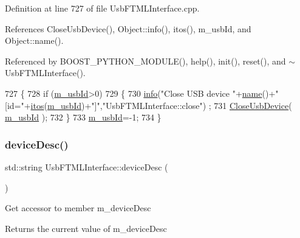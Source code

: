 Definition at line 727 of file Usb\+F\+T\+M\+L\+Interface.\+cpp.



References Close\+Usb\+Device(), Object\+::info(), itos(), m\+\_\+usb\+Id, and Object\+::name().



Referenced by B\+O\+O\+S\+T\+\_\+\+P\+Y\+T\+H\+O\+N\+\_\+\+M\+O\+D\+U\+L\+E(), help(), init(), reset(), and $\sim$\+Usb\+F\+T\+M\+L\+Interface().


\begin{DoxyCode}
727                                \{
728   \textcolor{keywordflow}{if} (\hyperlink{classUsbFTMLInterface_aab6754587c303660d5c498ce34a2b4c8}{m\_usbId}>0)
729   \{    
730     \hyperlink{classObject_a644fd329ea4cb85f54fa6846484b84a8}{info}(\textcolor{stringliteral}{"Close USB device "}+\hyperlink{classObject_a300f4c05dd468c7bb8b3c968868443c1}{name}()+\textcolor{stringliteral}{" [id="}+\hyperlink{Tools_8h_af330027dbdafb9a30768b3613c553e60}{itos}(\hyperlink{classUsbFTMLInterface_aab6754587c303660d5c498ce34a2b4c8}{m\_usbId})+\textcolor{stringliteral}{"]"},\textcolor{stringliteral}{"UsbFTMLInterface::close"})
      ;
731     \hyperlink{LALUsbML_8h_a3f0a3f9e09951c39ae1df0638008875a}{CloseUsbDevice}( \hyperlink{classUsbFTMLInterface_aab6754587c303660d5c498ce34a2b4c8}{m\_usbId} );
732   \}
733   \hyperlink{classUsbFTMLInterface_aab6754587c303660d5c498ce34a2b4c8}{m\_usbId}=-1;
734 \}
\end{DoxyCode}
\mbox{\label{classUsbFTMLInterface_ab541b4c57c1e7e947037acbfebc3fe3b}} 
\subsubsection{\texorpdfstring{device\+Desc()}{deviceDesc()}}
{\footnotesize\ttfamily std\+::string Usb\+F\+T\+M\+L\+Interface\+::device\+Desc (\begin{DoxyParamCaption}{ }\end{DoxyParamCaption})\hspace{0.3cm}{\ttfamily [inline]}}

Get accessor to member m\+\_\+device\+Desc \begin{DoxyReturn}{Returns}
the current value of m\+\_\+device\+Desc 
\end{DoxyReturn}


